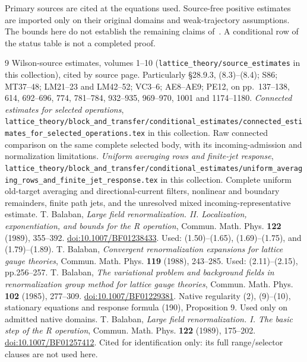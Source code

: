 \documentclass[11pt,letterpaper]{article}
\numberwithin{equation}{section}
\theoremstyle{plain}
\theoremstyle{remark}\newtheorem{remark}[theorem]{Scope}
\begin{document}
Primary sources are cited at the equations used. Source-free positive
estimates are imported only on their original domains and weak-trajectory
assumptions. The bounds here do not establish the remaining claims
of~\cite[pp.~1222--1226]{W}. A conditional row of the status table is not a
completed proof.

\begin{thebibliography}{9}
 Wilson-source estimates, volumes 1--10 (\texttt{lattice\_theory/source\_estimates} in this collection), cited by source page.
Particularly \S28.9.3, (8.3)--(8.4);
S86; MT37--48; LM21--23 and LM42--52; VC3--6; AE8--AE9; PE12, on
pp.~137--138, 614, 692--696, 774, 781--784, 932--935, 969--970, 1001 and 1174--1180.
 \emph{Connected estimates for selected operations}, \texttt{lattice\_theory/block\_and\_transfer/conditional\_estimates/connected\_estimates\_for\_selected\_operations.tex} in this collection.
Raw connected comparison on the same complete selected body, with its
incoming-admission and normalization limitations.
 \emph{Uniform averaging rows and finite-jet response}, \texttt{lattice\_theory/block\_and\_transfer/conditional\_estimates/uniform\_averaging\_rows\_and\_finite\_jet\_response.tex} in this collection.
Complete uniform old-target averaging and directional-current filters,
nonlinear and boundary remainders, finite path jets, and the unresolved
mixed incoming-representative estimate.
 T. Balaban, \emph{Large field renormalization. II.
Localization, exponentiation, and bounds for the R operation},
Commun. Math. Phys. \textbf{122} (1989), 355--392.
\href{https://doi.org/10.1007/BF01238433}{doi:10.1007/BF01238433}.
Used: (1.50)--(1.65), (1.69)--(1.75), and (1.79)--(1.89).
 T. Balaban, \emph{Convergent renormalization expansions for
lattice gauge theories}, Commun. Math. Phys. \textbf{119} (1988), 243--285.
Used: (2.11)--(2.15), pp.256--257.
 T. Balaban, \emph{The variational problem and
background fields in renormalization group method for lattice gauge
theories}, Commun. Math. Phys. \textbf{102} (1985), 277--309.
\href{https://doi.org/10.1007/BF01229381}{doi:10.1007/BF01229381}.
Native regularity (2), (9)--(10), stationary equations and response
formula (190), Proposition 9. Used only on admitted native domains.
 T. Balaban, \emph{Large field renormalization. I.
The basic step of the R operation}, Commun. Math. Phys. \textbf{122}
(1989), 175--202.
\href{https://doi.org/10.1007/BF01257412}{doi:10.1007/BF01257412}.
Cited for identification only: its full range/selector
clauses are not used here.
\end{thebibliography}
\end{document}

